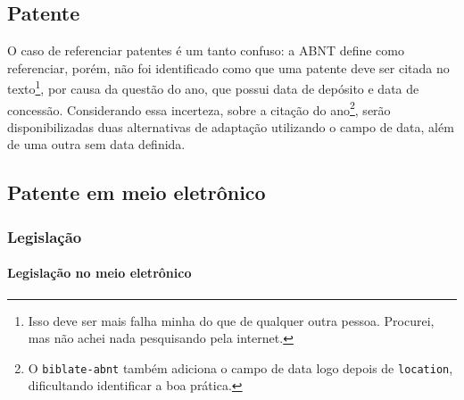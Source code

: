   \exOutros

\subsection{Patente} %
O caso de referenciar patentes é um tanto confuso: a ABNT define como referenciar, porém, não foi identificado como que uma patente deve ser citada no texto\footnote{Isso deve ser mais falha minha do que de qualquer outra pessoa. Procurei, mas não achei nada pesquisando pela internet.}, por causa da questão do ano, que possui data de depósito e data de concessão. Considerando essa incerteza, sobre a citação do ano\footnote{O \texttt{biblate-abnt} também adiciona o campo de data logo depois de \texttt{location}, dificultando identificar a boa prática.}, serão disponibilizadas duas alternativas de adaptação utilizando o campo de data, além de uma outra sem data definida.
  \exEssencial

  \exOutros

\subsection{Patente em meio eletrônico} %
  \exEssencial

\subsubsection{Legislação}


\paragraph{Legislação no meio eletrônico}


